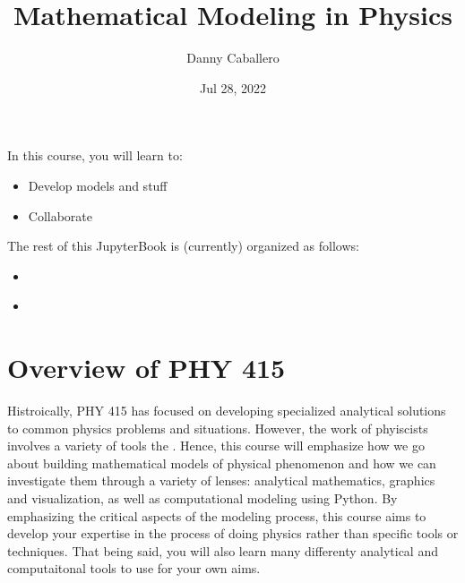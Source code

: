 \documentclass[letterpaper,10pt,english]{jupyterBook}
\title{Mathematical Modeling in Physics}
\date{Jul 28, 2022}
\author{Danny Caballero}
\begin{document}
\pagestyle{empty}
\sphinxmaketitle
\pagestyle{plain}
\sphinxtableofcontents
\pagestyle{normal}
\label{\detokenize{content/intro::doc}}






\sphinxAtStartPar
In this course, you will learn to:
\begin{itemize}
\item {} 
\sphinxAtStartPar
Develop models and stuff

\item {} 
\sphinxAtStartPar
Collaborate

\end{itemize}

\sphinxAtStartPar
The rest of this JupyterBook is (currently) organized as follows:
\begin{itemize}
\item {} 
\sphinxAtStartPar
{\hyperref[\detokenize{content/0_course/syllabus::doc}]{}}

\item {} 
\sphinxAtStartPar
{\hyperref[\detokenize{content/1_modeling/what_is_modeling::doc}]{}}

\end{itemize}

\sphinxstepscope


\chapter{Overview of PHY 415}
\label{\detokenize{content/0_course/syllabus:overview-of-phy-415}}\label{\detokenize{content/0_course/syllabus::doc}}
\sphinxAtStartPar
Histroically, PHY 415 has focused on developing specialized analytical solutions to common physics problems and situations. However, the work of phyiscists involves a variety of tools the . Hence, this course will emphasize how we go about building mathematical models of physical phenomenon and how we can investigate them through a variety of lenses: analytical mathematics, graphics and visualization, as well as computational modeling using Python. By emphasizing the critical aspects of the modeling process, this course aims to develop your expertise in the process of doing physics rather than specific tools or techniques. That being said, you will also learn many differenty analytical and computaitonal tools to use for your own aims.
\end{document}
